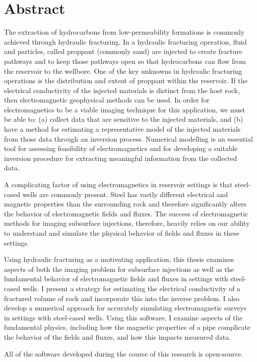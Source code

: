 
\chapter{Abstract}

The extraction of hydrocarbons from low-permeability formations is commonly achieved through hydraulic fracturing. In a hydraulic fracturing operation, fluid and particles, called proppant (commonly sand) are injected to create fracture pathways and to keep those pathways open so that hydrocarbons can flow from the reservoir to the wellbore. One of the key unknowns in hydraulic fracturing operations is the distribution and extent of proppant within the reservoir. If the electrical conductivity of the injected materials is distinct from the host rock, then electromagnetic geophysical methods can be used. In order for electromagnetics to be a viable imaging technique for this application, we must be able to: (a) collect data that are sensitive to the injected materials, and (b) have a method for estimating a representative model of the injected materials from those data through an inversion process. Numerical modelling is an essential tool for assessing feasibility of electromagnetics and for developing a suitable inversion procedure for extracting meaningful information from the collected data.

A complicating factor of using electromagnetics in reservoir settings is that steel-cased wells are commonly present. Steel has vastly different electrical and magnetic properties than the surrounding rock and therefore significantly alters the behavior of electromagnetic fields and fluxes. The success of electromagnetic methods for imaging subsurface injections, therefore, heavily relies on our ability to understand and simulate the physical behavior of fields and fluxes in these settings.

Using hydraulic fracturing as a motivating application, this thesis examines aspects of both the imaging problem for subsurface injections as well as the fundamental behavior of electromagnetic fields and fluxes in settings with steel-cased wells. I present a strategy for estimating the electrical conductivity of a fractured volume of rock and incorporate this into the inverse problem. I also develop a numerical approach for accurately simulating electromagnetic surveys in settings with steel-cased wells. Using this software, I examine aspects of the fundamental physics, including how the magnetic properties of a pipe complicate the behavior of the fields and fluxes, and how this impacts measured data.

All of the software developed during the course of this research is open-source.

\vfill
\begin{center}
\begin{sf}
\end{sf}
\end{center}
